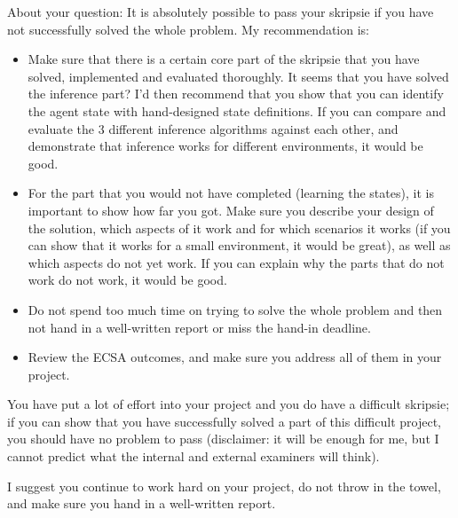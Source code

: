 \newpage

About your question: It is absolutely possible to pass your skripsie if you have not successfully solved the whole problem.  My recommendation is:

\begin{itemize}
	\item Make sure that there is a certain core part of the skripsie that you have solved, implemented and evaluated thoroughly.  It seems that you have solved the inference part?  I'd then recommend that you show that you can identify the agent state with hand-designed state definitions.  If you can compare and evaluate the 3 different inference algorithms against each other, and demonstrate that inference works for different environments, it would be good.  
	\item For the part that you would not have completed (learning the states), it is important to show how far you got.  Make sure you describe your design of the solution, which aspects of it work and for which scenarios it works (if you can show that it works for a small environment, it would be great), as well as which aspects do not yet work.  If you can explain why the parts that do not work do not work, it would be good.
	\item Do not spend too much time on trying to solve the whole problem and then not hand in a well-written report or miss the hand-in deadline.  
	\item Review the ECSA outcomes, and make sure you address all of them in your project.  
\end{itemize}

You have put a lot of effort into your project and you do have a difficult skripsie; if you can show that you have successfully solved a part of this difficult project, you should have no problem to pass (disclaimer: it will be enough for me, but I cannot predict what the internal and external examiners will think).

I suggest you continue to work hard on your project, do not throw in the towel, and make sure you hand in a well-written report.  






















